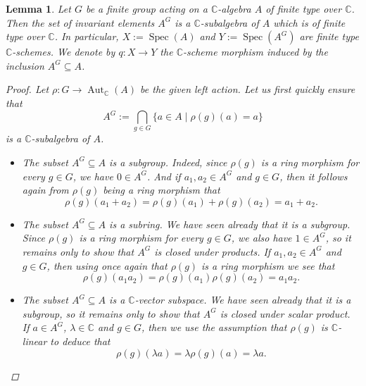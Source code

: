 \documentclass[12pt,a4paper]{amsart}
\theoremstyle{plain}
\newtheorem{lm}[thm]{Lemma}
\theoremstyle{definition}
\theoremstyle{remark}
\begin{document}
\begin{lm}\label{lm:finitetype}
  Let $G$ be a finite group acting on a $\mathbb{C}$-algebra $A$ of finite type over $\mathbb{C}$.
  Then the set of invariant elements $A^{G}$ is a $\mathbb{C}$-subalgebra of $A$ which is of finite type over $\mathbb{C}$.
  In particular, $X := \operatorname{Spec}(A)$ and $Y := \operatorname{Spec}(A^{G})$ are finite type $\mathbb{C}$-schemes.
  We denote by $q \colon X \to Y$ the $\mathbb{C}$-scheme morphism induced by the inclusion $A^{G} \subseteq A$.

  \begin{proof}
    Let $\rho \colon G \to \operatorname{Aut}_{\mathbb{C}}(A)$ be the given left action.
    Let us first quickly ensure that
    \[ A^{G} := \bigcap_{g \in G} \{ a \in A \mid \rho(g)(a) = a \} \]
    is a $\mathbb{C}$-subalgebra of $A$.
    \begin{itemize}
      \item The subset $A^{G} \subseteq A$ is a subgroup.
        Indeed, since $\rho(g)$ is a ring morphism for every $g \in G$, we have $0 \in A^{G}$.
        And if $a_{1}, a_{2} \in A^{G}$ and $g \in G$, then it follows again from $\rho(g)$ being a ring morphism that
        \[ \rho(g)(a_{1}+a_{2}) = \rho(g)(a_{1}) + \rho(g)(a_{2}) = a_{1} + a_{2}. \]
      \item The subset $A^{G} \subseteq A$ is a subring.
        We have seen already that it is a subgroup.
        Since $\rho(g)$ is a ring morphism for every $g \in G$, we also have $1 \in A^{G}$, so it remains only to show that $A^{G}$ is closed under products.
        If $a_{1}, a_{2} \in A^{G}$ and $g \in G$, then using once again that $\rho(g)$ is a ring morphism we see that
        \[ \rho(g)(a_{1}a_{2}) = \rho(g)(a_{1})\rho(g)(a_{2}) = a_{1}a_{2}. \]
      \item The subset $A^{G} \subseteq A$ is a $\mathbb{C}$-vector subspace.
        We have seen already that it is a subgroup, so it remains only to show that $A^{G}$ is closed under scalar product.
        If $a \in A^{G}$, $\lambda \in \mathbb{C}$ and $g \in G$, then we use the assumption that $\rho(g)$ is $\mathbb{C}$-linear to deduce that
        \[ \rho(g)(\lambda a) = \lambda \rho(g)(a) = \lambda a. \]
    \end{itemize}
    

\end{proof}
\end{lm}
\end{document}
